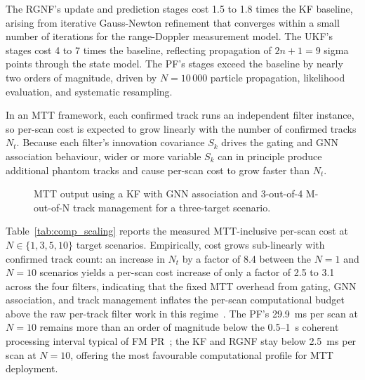 \documentclass[conference]{IEEEtran}
\begin{document}
The RGNF's update and prediction stages cost 1.5 to 1.8 times the KF
baseline, arising from iterative Gauss-Newton refinement that converges
within a small number of iterations for the range-Doppler measurement
model. The UKF's stages cost 4 to 7 times the baseline, reflecting
propagation of $2n{+}1 = 9$ sigma points through the state model. The
PF's stages exceed the baseline by nearly two orders of magnitude,
driven by $N = 10\,000$ particle propagation, likelihood evaluation,
and systematic resampling.




In an MTT framework, each confirmed track runs an independent filter
instance, so per-scan cost is expected to grow linearly with the number
of confirmed tracks $N_t$. Because each filter's innovation covariance
$S_k$ drives the gating and GNN association behaviour, wider or more
variable $S_k$ can in principle produce additional phantom tracks and
cause per-scan cost to grow faster than $N_t$.

\begin{figure}[htbp]
  \centering
  
  \caption{MTT output using a KF with GNN association and 3-out-of-4 M-out-of-N track management for a
three-target scenario.}
  \label{fig:mtt_output}
\end{figure}

Table~\ref{tab:comp_scaling} reports the measured MTT-inclusive per-scan
cost at $N \in \{1,3,5,10\}$ target scenarios. Empirically, cost grows
sub-linearly with confirmed track count: an increase in $N_t$ by a
factor of 8.4 between the $N{=}1$ and $N{=}10$ scenarios yields a
per-scan cost increase of only a factor of 2.5 to 3.1 across the four
filters, indicating that the fixed MTT overhead from gating, GNN
association, and track management inflates the per-scan computational
budget above the raw per-track filter work in this
regime~\cite{Konstantinova2003}. The PF's 29.9~ms per scan at
$N{=}10$ remains more than an order of magnitude below the 0.5--1~s
coherent processing interval typical of FM PR~\cite{Howland2005a};
the KF and RGNF stay below 2.5~ms per scan at $N{=}10$, offering the
most favourable computational profile for MTT deployment.
\end{document}
